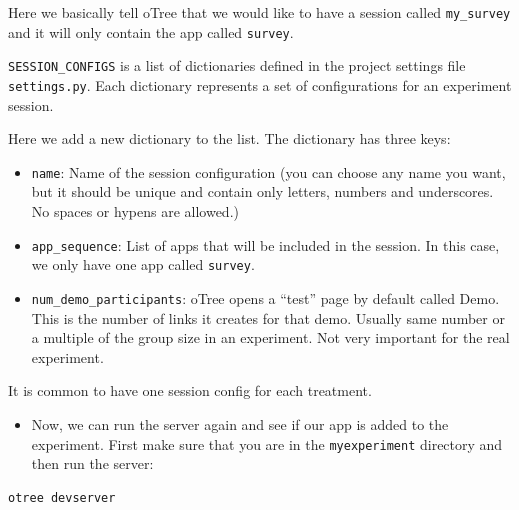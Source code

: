 \documentclass[
  letterpaper,
  DIV=11,
  numbers=noendperiod]{scrreprt}
\providecommand{\tightlist}{%
  \setlength{\itemsep}{0pt}\setlength{\parskip}{0pt}}\usepackage{longtable,booktabs,array}
\begin{document}
Here we basically tell oTree that we would like to have a session called
\texttt{my\_survey} and it will only contain the app called
\texttt{survey}.

\begin{tcolorbox}[enhanced jigsaw, bottomrule=.15mm, titlerule=0mm, rightrule=.15mm, breakable, colframe=quarto-callout-note-color-frame, title=\textcolor{quarto-callout-note-color}{\faInfo}\hspace{0.5em}{A look at SESSION\_CONFIGS}, coltitle=black, colbacktitle=quarto-callout-note-color!10!white, colback=white, arc=.35mm, opacitybacktitle=0.6, bottomtitle=1mm, toptitle=1mm, leftrule=.75mm, toprule=.15mm, left=2mm, opacityback=0]

\texttt{SESSION\_CONFIGS} is a list of dictionaries defined in the
project settings file \texttt{settings.py}. Each dictionary represents a
set of configurations for an experiment session.

Here we add a new dictionary to the list. The dictionary has three keys:

\begin{itemize}
\item
  \texttt{name}: Name of the session configuration (you can choose any
  name you want, but it should be unique and contain only letters,
  numbers and underscores. No spaces or hypens are allowed.)
\item
  \texttt{app\_sequence}: List of apps that will be included in the
  session. In this case, we only have one app called \texttt{survey}.
\item
  \texttt{num\_demo\_participants}: oTree opens a ``test'' page by
  default called Demo. This is the number of links it creates for that
  demo. Usually same number or a multiple of the group size in an
  experiment. Not very important for the real experiment.
\end{itemize}

It is common to have one session config for each treatment.

\end{tcolorbox}

\begin{itemize}
\tightlist
\item
  Now, we can run the server again and see if our app is added to the
  experiment. First make sure that you are in the \texttt{myexperiment}
  directory and then run the server:
\end{itemize}

\begin{verbatim}
otree devserver
\end{verbatim}
\end{document}
